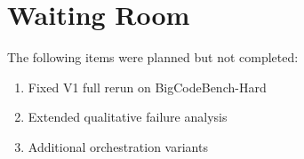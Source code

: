 \documentclass[11pt]{article}
\begin{document}
\section{Waiting Room}

The following items were planned but not completed:

\begin{enumerate}
    \item Fixed V1 full rerun on BigCodeBench-Hard
    \item Extended qualitative failure analysis
    \item Additional orchestration variants
\end{enumerate}



\end{document}
